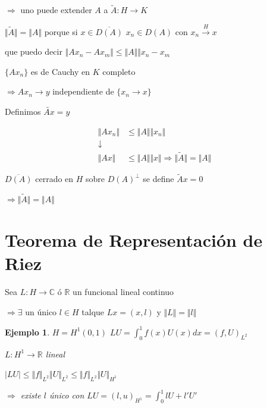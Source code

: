 \documentclass[a4paper,10pt]{book}
\newtheorem{ejemplo}{Ejemplo}
\begin{document}
$\Rightarrow$ uno puede extender $A$ a $\tilde{A}: H\rightarrow K $  

$\Vert\tilde{A}\Vert =\Vert A\Vert $ porque si $x\in \overline{D(A)} $  $x_n\in D(A) $ con $x_n \overset{H}{\rightarrow} x $

que puedo decir $\Vert A x_n - A x_m\Vert \leq \Vert A \Vert \Vert x_n -x_m$ 

$\{A x_n\}$ es de Cauchy en $K$ completo 

$ \Rightarrow Ax_n\rightarrow y $ independiente de $\{ x_n\rightarrow x\}$

Definimos $\tilde{ A x} =y$

\begin{align*}
 \Vert A x_n \Vert & \leq \Vert A \Vert \Vert x_n \Vert \\
 \downarrow &  \\
 \Vert A x \Vert &\leq \Vert A \Vert \Vert x \Vert \Rightarrow \Vert \tilde{A} \Vert = \Vert A \Vert
\end{align*}

$\overline{D(A)}$ cerrado en $H$ sobre $D(A)^\perp$ se define $\tilde{A}x =0$

$\Rightarrow \Vert \tilde{A} \Vert =\Vert A\Vert $


\section{Teorema de Representación de Riez}
 
Sea $L: H \rightarrow \mathbb{C} $ ó $\mathbb{R}$ un funcional lineal continuo

$\Rightarrow \exists  $ un único $l\in H$ talque $Lx=(x,l)$  y $\Vert L\Vert =\Vert l \Vert$

\begin{ejemplo}
    $H= H^1(0,1)$  $ LU = \int_0^1 f(x) U(x) dx =(f,U)_{L^2}$

    $L:H^1 \rightarrow \mathbb{R} $ lineal

    $|LU |\leq \Vert f\Vert_{L^2} \Vert U \Vert_{L^2} \leq \Vert f\Vert_{L^2} \Vert U \Vert_{H^1} $

    $\Rightarrow$ existe $l$ único con $LU= (l,u)_{H^1} = \int_0^1 l U +l' U' $
\end{ejemplo}
\end{document}
